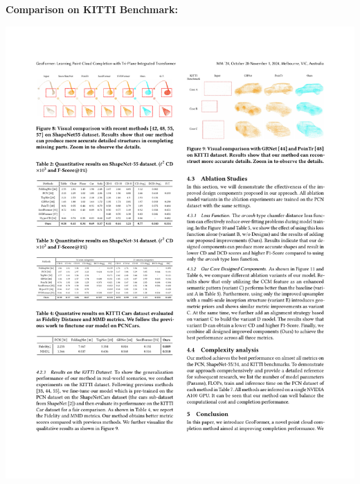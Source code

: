 \documentclass[landscape,a0paper,fontscale=0.292]{baposter}
\begin{document}
\begin{poster}
{\begin{minipage}[t]{0.49\textwidth}
\begin{center}
        \end{center}
        \vspace{-1.0em}
        \textbf{\color{ctitle}Comparison on KITTI Benchmark:}
        \vspace{-0.5em}
        \begin{center}
            \includegraphics[width=\textwidth]{images/table-KITTI.pdf}
        \end{center}
        \vspace{-1.5em}
        \begin{center}

\end{center}
\end{minipage}}
\end{poster}
\end{document}
